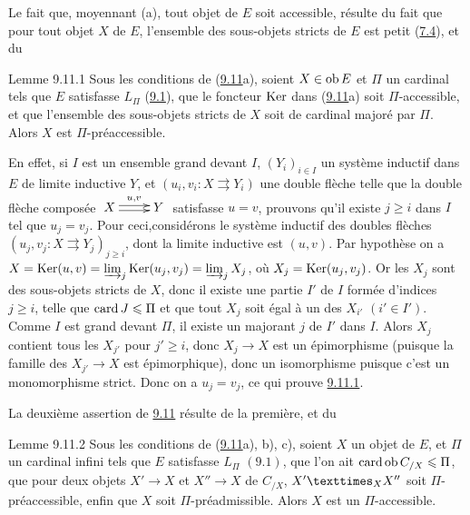 \documentclass[10pt]{../fichiers-configuration-latex/smfart}
\begin{document}
Le fait que, moyennant (a), tout objet de $E$ soit accessible,
résulte du fait que pour tout objet $X$ de $E$, l'ensemble des
sous-objets stricts de $E$ est petit (\hyperref[I.prop7.4]{7.4}), et du

\begin{enonce*}{Lemme 9.11.1}
Sous les conditions de (\hyperref[I.prop9.11]{9.11}a), soient $X\in \operatorname{ob} E$ et
$\Pi$ un cardinal tels que $E$ satisfasse $L_{\Pi}$
(\hyperref[I.def9.1]{9.1}), que le foncteur $\operatorname{Ker}$ dans (\hyperref[I.prop9.11]{9.11}a)
soit $\Pi$-accessible, et que l'ensemble des sous-objets stricts de
$X$ soit de cardinal majoré par $\Pi$. Alors $X$ est
$\Pi$-préaccessible.
\end{enonce*}

En effet, si $I$ est un ensemble grand devant $I$, $(Y_i)_{i\in I}$
un système inductif dans $E$ de limite inductive $Y$, et $(u_i,
v_i:X\rightrightarrows Y_i)$ une double flèche telle que la double
flèche composée $ \xymatrix{ X \ar@<2pt>[r]^{u,v} \ar@<-2pt>[r]& Y
}$ satisfasse $u=v$, prouvons qu'il existe $j\geq i$ dans $I$ tel
que $u_j=v_j$. Pour ceci,\pageoriginale considérons le système
inductif des doubles flèches $(u_j,v_j:X\rightrightarrows
Y_j)_{j\geq i}$, dont la limite inductive est $(u,v)$. Par hypothèse
on a $X=\operatorname{Ker}(u,v)=\varinjlim_j \operatorname{Ker} (u_j,v_j)=\varinjlim_j X_j$, où
$X_j=\operatorname{Ker}(u_j,v_j)$. Or les $X_j$ sont des sous-objets stricts de
$X$, donc il existe une partie $I'$ de $I$ formée d'indices $j\geq
i$, telle que $\operatorname{card} J\leqslant\Pi$ et que tout $X_j$ soit égal à un des
$X_{i'}$ $(i'\in I')$. Comme $I$ est grand devant $\Pi$, il existe
un majorant $j$ de $I'$ dans $I$. Alors $X_j$ contient tous les
$X_{j'}$ pour $j'\geq i$, donc $X_j\rightarrow X$ est un
épimorphisme (puisque la famille des $X_{j'}\rightarrow X$ est
épimorphique), donc un isomorphisme puisque c'est un monomorphisme
strict. Donc on a $u_j=v_j$, ce qui prouve \hyperref[I.lem9.11.1]{9.11.1}.

La deuxième assertion de \hyperref[I.prop9.11]{9.11} résulte de la première, et
du

\begin{enonce*}{Lemme 9.11.2}
Sous les conditions de (\hyperref[I.prop9.11]{9.11}a), b), c), soient $X$ un
objet de $E$, et $\Pi$ un cardinal infini tels que $E$ satisfasse
$L_{\Pi}$ $(9.1)$, que l'on ait $\operatorname{card} \operatorname{ob} C_{/X}\leqslant \Pi$, que pour
deux objets $X'\rightarrow X$ et $X''\rightarrow X$ de $C_{/X}$,
$\fprod{X'}{X''}{X}$ soit $\Pi$-préaccessible, enfin que $X$ soit
$\Pi$-préadmissible. Alors $X$ est un $\Pi$-accessible.
\end{enonce*}
\end{document}
